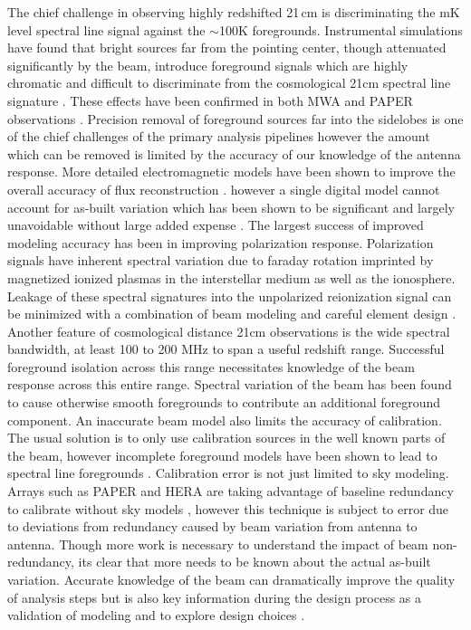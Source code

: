 \documentclass[preprint2,numberedappendix,tighten,twocolappendix]{aastex6}
\begin{document}
The chief challenge in observing highly redshifted 21\,cm is discriminating the mK level spectral line signal against the $\sim$100K foregrounds.  Instrumental simulations have found that bright sources far from the pointing center, though attenuated significantly by the beam, introduce foreground signals which are highly chromatic and difficult to discriminate from the cosmological 21cm spectral line signature \citep{Thyagarajan:2013p10039,2015ApJ...804...14T,Mort:2016SKAlowimagingarxiv}. These effects have been confirmed in both MWA and PAPER observations \citep{2015:ThyagarajanConfirmationwidefield,Pober:2016ApJ...819....8P}. Precision removal of foreground sources far into the sidelobes is one of the chief challenges of the primary analysis pipelines  \citep{2016:JacobsPipelinepaper} however the amount which can be removed is limited by the accuracy of our knowledge of the antenna response.  More detailed electromagnetic models have been shown to improve the overall accuracy of flux reconstruction \citep{Sutinjo:2015RaSc...50...52S}. however a single digital model cannot account for as-built variation which has been shown to be significant and largely unavoidable without large added expense \citep{2016:NebenBeamformingerrors}.  The largest success of improved modeling accuracy has been in improving polarization response. Polarization signals have inherent spectral variation due to faraday rotation imprinted by magnetized ionized plasmas in the interstellar medium as well as the ionosphere. Leakage of these spectral signatures into the unpolarized reionization signal can be minimized with a combination of beam modeling and careful element design \citep{Jelic:2010p8293,Moore:2013p9941,Asad:2015LofarPol}. Another feature of cosmological distance 21cm observations is the wide spectral bandwidth, at least 100 to 200 MHz to span a useful redshift range. Successful foreground isolation across this range necessitates knowledge of the beam response across this entire range.  Spectral variation of the beam has been found to cause otherwise smooth foregrounds to contribute an additional foreground component\citep{2016:ThyagarajanBeamChromaticity,2016:EwallWiceHERAdisharXiv}. An inaccurate beam model also limits the accuracy of calibration. The usual solution is to only use calibration sources in the well known parts of the beam, however incomplete foreground models have been shown to lead to spectral line foregrounds \citep{2016:BarryCalibrationRequirements}.  Calibration error is not just limited to sky modeling. Arrays such as PAPER and HERA are taking advantage of baseline redundancy to calibrate without sky models \citep{Liu:2010p10391,Zheng:2014p10467,2015ApJ...809...61A}, however this technique is subject to error due to deviations from redundancy caused by beam variation from antenna to antenna. Though more work is necessary to understand the impact of beam non-redundancy, its clear that more needs to be known about the actual as-built variation.  Accurate knowledge of the beam can dramatically improve the quality of analysis steps but is also key information during the design process as a validation of modeling and to explore design choices \citep{2014IAWPL..13..169V,2016:NebenHERAdish}.
\end{document}
